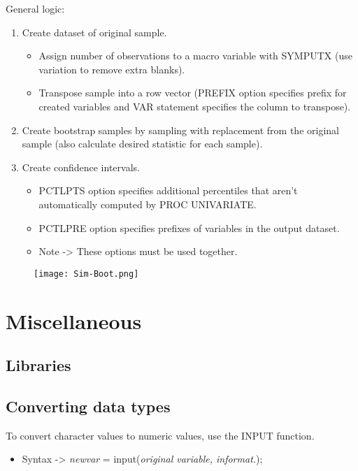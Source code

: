 \documentclass[11pt, oneside]{article}
\begin{document}
General logic:
\begin{enumerate}
\item Create dataset of original sample.
	\begin{itemize}
	\item Assign number of observations to a macro variable with SYMPUTX (use variation to remove extra blanks).
	\item Transpose sample into a row vector (PREFIX option specifies prefix for created variables and VAR statement specifies the column to transpose). 
	\end{itemize}
\item Create bootstrap samples by sampling with replacement from the original sample (also calculate desired statistic for each sample).
\item Create confidence intervals.
	\begin{itemize}
	\item PCTLPTS option specifies additional percentiles that aren't automatically computed by PROC UNIVARIATE.
	\item PCTLPRE option specifies prefixes of variables in the output dataset.
	\item Note -> These options must be used together.
	\end{itemize}
\end{enumerate}


\begin{figure}[H]
\texttt{[image: Sim-Boot.png]}
\end{figure}

\section{Miscellaneous}

\subsection{Libraries}



\subsection{Converting data types}

To convert character values to numeric values, use the INPUT function.
\begin{itemize}
\item Syntax -> \textit{newvar} = input(\textit{original variable, informat.});
\end{itemize}
\end{document}
